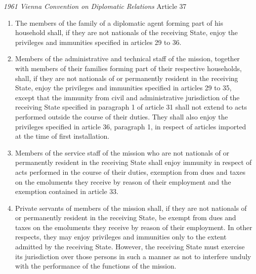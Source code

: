\begin{conventiondetails}{\textit{1961 Vienna Convention on Diplomatic Relations} Article 37}
    \flushleft
    \begin{enumerate}
        \item The members of the family of a diplomatic agent forming part of his household shall, if they are not nationals of the receiving State, enjoy the privileges and immunities specified in articles 29 to 36.
        \item Members of the administrative and technical staff of the mission, together with members of their families forming part of their respective households, shall, if they are not nationals of or permanently resident in the receiving State, enjoy the privileges and immunities specified in articles 29 to 35, except that the immunity from civil and administrative jurisdiction of the receiving State specified in paragraph 1 of article 31 shall not extend to acts performed outside the course of their duties. They shall also enjoy the privileges specified in article 36, paragraph 1, in respect of articles imported at the time of first installation.
        \item Members of the service staff of the mission who are not nationals of or permanently resident in the receiving State shall enjoy immunity in respect of acts performed in the course of their duties, exemption from dues and taxes on the emoluments they receive by reason of their employment and the exemption contained in article 33.
        \item Private servants of members of the mission shall, if they are not nationals of or permanently resident in the receiving State, be exempt from dues and taxes on the emoluments they receive by reason of their employment. In other respects, they may enjoy privileges and immunities only to the extent admitted by the receiving State. However, the receiving State must exercise its jurisdiction over those persons in such a manner as not to interfere unduly with the performance of the functions of the mission.
    \end{enumerate}
\end{conventiondetails}

